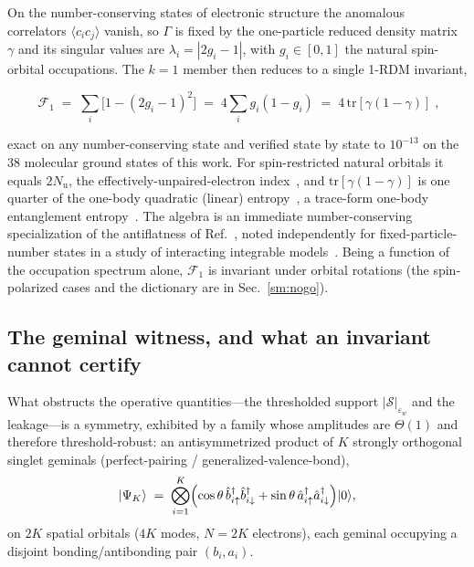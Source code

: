 On the number-conserving states of electronic structure the anomalous correlators $\langle c_ic_j\rangle$
vanish, so $\Gamma$ is fixed by the one-particle reduced density matrix $\gamma$ and its singular values
are $\lambda_i=|2g_i-1|$, with $g_i\in[0,1]$ the natural spin-orbital occupations. The $k=1$ member then
reduces to a single 1-RDM invariant,
\begin{widetext}
\begin{equation}
\boxed{\;\mathcal F_1 \;=\; \sum_i\bigl[1-(2g_i-1)^2\bigr] \;=\; 4\sum_i g_i(1-g_i)
\;=\; 4\,\mathrm{tr}[\gamma(1-\gamma)]\;,}
\label{eq:collapse}
\end{equation}
\end{widetext}
exact on any number-conserving state and verified state by state to $10^{-13}$ on the $38$ molecular
ground states of this work. For spin-restricted natural orbitals it equals $2N_{\mathrm u}$, the
effectively-unpaired-electron index~\cite{takatsuka1978,staroverov2000}, and
$\mathrm{tr}[\gamma(1-\gamma)]$ is one quarter of the one-body quadratic (linear)
entropy~\cite{gigena2015}, a trace-form one-body entanglement entropy~\cite{gigena2020}. The
algebra is an immediate number-conserving specialization of the antiflatness of
Ref.~\cite{sierant2026}, noted independently for fixed-particle-number states in a study of
interacting integrable models~\cite{swietek2026}. Being a function of the occupation spectrum alone,
$\mathcal F_1$ is invariant under orbital rotations (the spin-polarized cases and the dictionary are in
Sec.~\ref{sm:nogo}).

\subsection{The geminal witness, and what an invariant cannot certify}
\label{sec:nogo:witness}

What obstructs the operative quantities---the thresholded support $|\mathcal S|_{\varepsilon_w}$ and
the leakage---is a symmetry, exhibited by a family
whose amplitudes are $\Theta(1)$ and therefore threshold-robust: an antisymmetrized product of $K$
strongly orthogonal singlet geminals (perfect-pairing / generalized-valence-bond),
\begin{equation}
\ket{\Psi_K}\;=\;\bigotimes_{i=1}^{K}\Bigl(\cos\theta\,\hat b^{\dagger}_{i\uparrow}\hat b^{\dagger}_{i\downarrow}
+\sin\theta\,\hat a^{\dagger}_{i\uparrow}\hat a^{\dagger}_{i\downarrow}\Bigr)\ket{0},
\label{eq:apsg}
\end{equation}
on $2K$ spatial orbitals ($4K$ modes, $N=2K$ electrons), each geminal occupying a disjoint
bonding/antibonding pair $(b_i,a_i)$.

